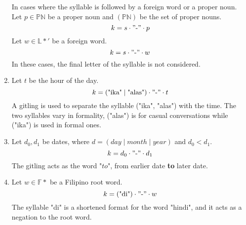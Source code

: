 \begin{enumerate}
            In cases where the syllable is followed by a foreign word or a proper noun. Let \(p \in \mathbb{PN}\) be a proper noun and \((\mathbb{PN})\) be the set of proper nouns.
            \[
            k = s \cdot "\text{-}" \cdot p
            \]
            Let \(w \in \mathbb{L*'}\) be a foreign word.
            \[
            k = s \cdot "\text{-}" \cdot w
            \]
            In these cases, the final letter of the syllable is not considered.
      \item
            Let $t$ be the hour of the day.
            \[
            k = (\text{"ika"}\mid\text{"alas"}) \cdot "\text{-}" \cdot t
            \]
            A gitling is used to separate the syllable ("ika", "alas") with the time. The two syllables vary in formality, ("alas") is for casual conversations while ("ika") is used in formal ones. 
      \item
            Let \(d_0, d_1\) be dates, where \(d = (day \mid month \mid year)\) and \(d_0 < d_1\).
            \[
            k = d_0 \cdot "\text{-}" \cdot d_1
            \]
            The gitling acts as the word "$to$", from earlier date \textbf{to} later date.
    \item 
            Let \(w \in \mathbb{F}*\) be a Filipino root word.
            \[
            k = (\text{"di"}) \cdot "\text{-}" \cdot w
            \]
            The syllable "di" is a shortened format for the word "hindi", and it acts as a negation to the root word.
            
      
\end{enumerate}